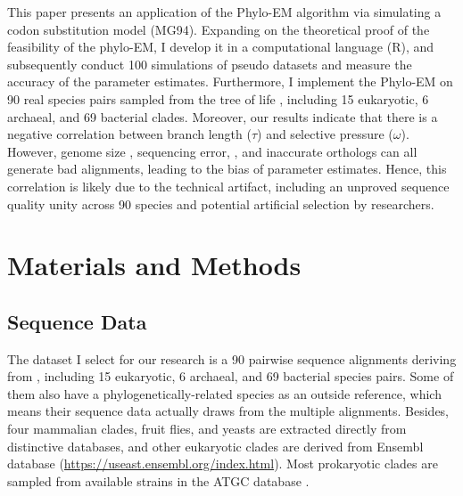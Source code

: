\indent This paper presents an application of the Phylo-EM algorithm via simulating a codon substitution model (MG94). Expanding on the theoretical proof of the feasibility of the phylo-EM, I develop it in a computational language (R), and subsequently conduct 100 simulations of pseudo datasets and measure the accuracy of the parameter estimates. Furthermore, I implement the Phylo-EM on 90 real species pairs sampled from the tree of life \parencite{zou2021nonsynonymous}, including 15 eukaryotic, 6 archaeal, and 69 bacterial clades. Moreover, our results indicate that there is a negative correlation between branch length ($\tau$) and selective pressure ($\omega$). However, genome size \parencite{simpson2014exploring}, sequencing error, \parencite{schneider2009estimates}, and inaccurate orthologs can all generate bad alignments, leading to the bias of parameter estimates.  Hence, this correlation is likely due to the technical artifact, including an unproved sequence quality unity across 90 species and potential artificial selection by researchers.


\section{Materials and Methods}
\subsection{Sequence Data}
The dataset I select for our research is a 90 pairwise sequence alignments deriving from \parencite{zou2021nonsynonymous}, including 15 eukaryotic, 6 archaeal, and 69 bacterial species pairs. Some of them also have a phylogenetically-related species as an outside reference, which means their sequence data actually draws from the multiple alignments. Besides, four mammalian clades, fruit flies, and yeasts are extracted directly from distinctive databases, and other eukaryotic clades are derived from Ensembl database (\href{https://useast.ensembl.org/index.html}{https://useast.ensembl.org/index.html}). Most prokaryotic clades are sampled from available strains in the ATGC database \parencite{kristensen2016atgc}.

